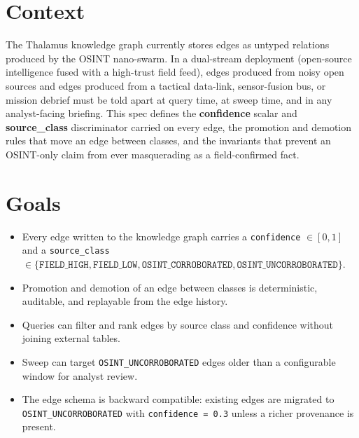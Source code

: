 




\makespecheader

\section{Context}
The Thalamus knowledge graph currently stores edges as untyped relations produced by the OSINT nano-swarm. In a dual-stream deployment (open-source intelligence fused with a high-trust field feed), edges produced from noisy open sources and edges produced from a tactical data-link, sensor-fusion bus, or mission debrief must be told apart at query time, at sweep time, and in any analyst-facing briefing. This spec defines the \textbf{confidence} scalar and \textbf{source\_class} discriminator carried on every edge, the promotion and demotion rules that move an edge between classes, and the invariants that prevent an OSINT-only claim from ever masquerading as a field-confirmed fact.

\section{Goals}
\begin{itemize}[leftmargin=1.2em]
  \item Every edge written to the knowledge graph carries a \texttt{confidence} $\in [0,1]$ and a \texttt{source\_class} $\in \{\texttt{FIELD\_HIGH}, \texttt{FIELD\_LOW}, \texttt{OSINT\_CORROBORATED}, \texttt{OSINT\_UNCORROBORATED}\}$.
  \item Promotion and demotion of an edge between classes is deterministic, auditable, and replayable from the edge history.
  \item Queries can filter and rank edges by source class and confidence without joining external tables.
  \item Sweep can target \texttt{OSINT\_UNCORROBORATED} edges older than a configurable window for analyst review.
  \item The edge schema is backward compatible: existing edges are migrated to \texttt{OSINT\_UNCORROBORATED} with \texttt{confidence = 0.3} unless a richer provenance is present.
\end{itemize}

